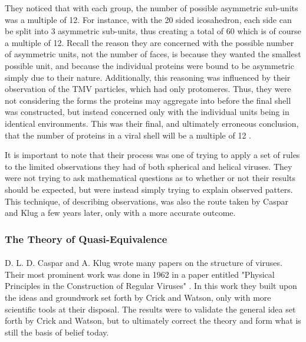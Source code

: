 \documentclass[12pt,letter]{article}
\begin{document}
They noticed that with each group, the number of possible asymmetric sub-units was a multiple of 12. For instance, with the 20 sided icosahedron, each side can be split into 3 asymmetric sub-units, thus creating a total of 60 which is of course a multiple of 12. Recall the reason they are concerned with the possible number of asymmetric units, not the number of faces, is because they wanted the smallest possible unit, and because the individual proteins were bound to be asymmetric simply due to their nature. Additionally, this reasoning was influenced by their observation of the TMV particles, which had only protomeres. Thus, they were not considering the forms the proteins may aggregate into before the final shell was constructed, but instead concerned only with the individual units being in identical environments. This was their final, and ultimately erroneous conclusion, that the number of proteins in a viral shell will be a multiple of 12 \cite[p 475]{Crick:1956}.

It is important to note that their process was one of trying to apply a set of rules to the limited observations they had of both spherical and helical viruses. They were not trying to ask mathematical questions as to whether or not their results should be expected, but were instead simply trying to explain observed patters. This technique, of describing observations, was also the route taken by Caspar and Klug a few years later, only with a more accurate outcome.

\subsubsection{The Theory of Quasi-Equivalence}
\paragraph{}

D. L. D. Caspar and  A. Klug wrote many papers on the structure of viruses. Their most prominent work was done in 1962 in a paper entitled "Physical Principles in the Construction of Regular Viruses" \cite{Caspar:1962}. In this work they built upon the ideas and groundwork set forth by Crick and Watson, only with more scientific tools at their disposal. The results were to validate the general idea set forth by Crick and Watson, but to ultimately correct the theory and form what is still the basis of belief today.
\end{document}

